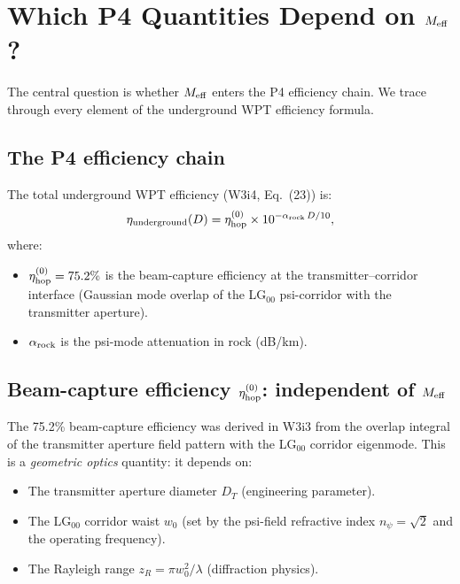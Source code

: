 \documentclass[11pt]{article}
\newcommand{\Meff}{M_{\rm eff}}
\newcommand{\etahop}{\eta_{\rm hop}}
\newcommand{\alpharock}{\alpha_{\rm rock}}
\begin{document}
\section{Which P4 Quantities Depend on $\Meff$?}
\label{sec:P4-Meff-audit}

The central question is whether $\Meff$ enters the P4 efficiency chain.
We trace through every element of the underground WPT efficiency formula.

\subsection{The P4 efficiency chain}

The total underground WPT efficiency (W3i4, Eq.~(23)) is:
\begin{equation}
\eta_{\rm underground}(D) = \etahop^{(0)} \times 10^{-\alpharock\,D/10},
\label{eq:eta-underground}
\end{equation}
where:
\begin{itemize}
\item $\etahop^{(0)} = 75.2\%$ is the beam-capture efficiency at the
  transmitter--corridor interface (Gaussian mode overlap of the LG$_{00}$
  psi-corridor with the transmitter aperture).
\item $\alpharock$ is the psi-mode attenuation in rock (dB/km).
\end{itemize}

\subsection{Beam-capture efficiency $\etahop^{(0)}$: independent of $\Meff$}

The 75.2\% beam-capture efficiency was derived in W3i3 from the overlap integral
of the transmitter aperture field pattern with the LG$_{00}$ corridor eigenmode.
This is a \emph{geometric optics} quantity: it depends on:
\begin{itemize}
\item The transmitter aperture diameter $D_T$ (engineering parameter).
\item The LG$_{00}$ corridor waist $w_0$ (set by the psi-field refractive
  index $n_\psi = \sqrt{2}$ and the operating frequency).
\item The Rayleigh range $z_R = \pi w_0^2/\lambda$ (diffraction physics).
\end{itemize}
\end{document}
